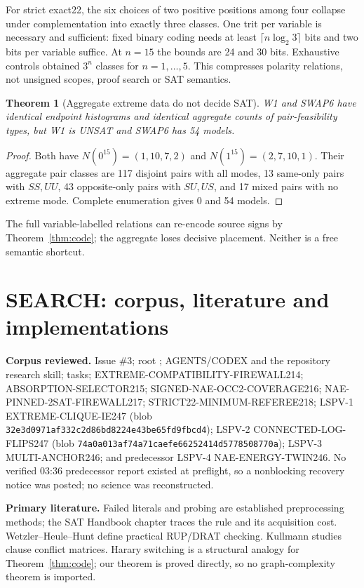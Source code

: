\documentclass[10pt]{article}
\newtheorem{theorem}{Theorem}
\begin{document}
For strict exact22, the six choices of two positive positions among four collapse under complementation into exactly three classes. One trit per variable is necessary and sufficient: fixed binary coding needs at least $\lceil n\log_2 3\rceil$ bits and two bits per variable suffice. At $n=15$ the bounds are 24 and 30 bits. Exhaustive controls obtained $3^n$ classes for $n=1,\ldots,5$. This compresses polarity relations, not unsigned scopes, proof search or SAT semantics.

\begin{theorem}[Aggregate extreme data do not decide SAT]\label{thm:collision}
W1 and SWAP6 have identical endpoint histograms and identical aggregate counts of pair-feasibility types, but W1 is UNSAT and SWAP6 has 54 models.
\end{theorem}
\begin{proof}
Both have $N(0^{15})=(1,10,7,2)$ and $N(1^{15})=(2,7,10,1)$. Their aggregate pair classes are 117 disjoint pairs with all modes, 13 same-only pairs with $SS,UU$, 43 opposite-only pairs with $SU,US$, and 17 mixed pairs with no extreme mode. Complete enumeration gives 0 and 54 models.
\end{proof}
The full variable-labelled relations can re-encode source signs by Theorem~\ref{thm:code}; the aggregate loses decisive placement. Neither is a free semantic shortcut.

\section{SEARCH: corpus, literature and implementations}
\textbf{Corpus reviewed.} Issue \#3; root ; AGENTS/CODEX and the repository research skill; tasks; EXTREME-COMPATIBILITY-FIREWALL214; ABSORPTION-SELECTOR215; SIGNED-NAE-OCC2-COVERAGE216; NAE-PINNED-2SAT-FIREWALL217; STRICT22-MINIMUM-REFEREE218; LSPV-1 EXTREME-CLIQUE-IE247 (blob \texttt{32e3d0971af332c2d86bd8224e43be65fd9fbcd4}); LSPV-2 CONNECTED-LOG-FLIPS247 (blob \texttt{74a0a013af74a71caefe66252414d5778508770a}); LSPV-3 MULTI-ANCHOR246; and predecessor LSPV-4 NAE-ENERGY-TWIN246. No verified 03:36 predecessor report existed at preflight, so a nonblocking recovery notice was posted; no science was reconstructed.

\textbf{Primary literature.} Failed literals and probing are established preprocessing methods; the SAT Handbook chapter traces the rule and its acquisition cost. Wetzler--Heule--Hunt define practical RUP/DRAT checking. Kullmann studies clause conflict matrices. Harary switching is a structural analogy for Theorem~\ref{thm:code}; our theorem is proved directly, so no graph-complexity theorem is imported.
\end{document}
